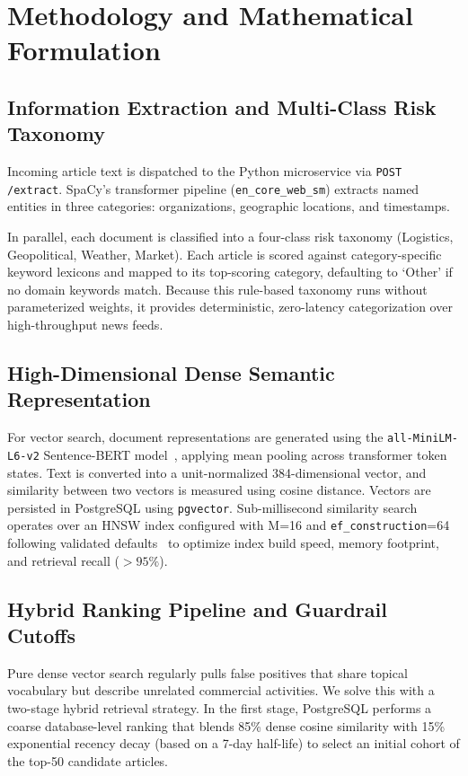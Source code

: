 \documentclass[conference]{IEEEtran}
\begin{document}
\section{Methodology and Mathematical Formulation}

\subsection{Information Extraction and Multi-Class Risk Taxonomy}
Incoming article text is dispatched to the Python microservice via \texttt{POST /extract}. SpaCy's transformer pipeline (\texttt{en\_core\_web\_sm}) extracts named entities in three categories: organizations, geographic locations, and timestamps.

In parallel, each document is classified into a four-class risk taxonomy (Logistics, Geopolitical, Weather, Market). Each article is scored against category-specific keyword lexicons and mapped to its top-scoring category, defaulting to `Other' if no domain keywords match. Because this rule-based taxonomy runs without parameterized weights, it provides deterministic, zero-latency categorization over high-throughput news feeds.

\subsection{High-Dimensional Dense Semantic Representation}
For vector search, document representations are generated using the \texttt{all-MiniLM-L6-v2} Sentence-BERT model~\cite{reimers2019sentence}, applying mean pooling across transformer token states. Text is converted into a unit-normalized 384-dimensional vector, and similarity between two vectors is measured using cosine distance. Vectors are persisted in PostgreSQL using \texttt{pgvector}. Sub-millisecond similarity search operates over an HNSW index configured with M=16 and \texttt{ef\_construction}=64 following validated defaults~\cite{malkov2020efficient} to optimize index build speed, memory footprint, and retrieval recall ($>95\%$).

\subsection{Hybrid Ranking Pipeline and Guardrail Cutoffs}
Pure dense vector search regularly pulls false positives that share topical vocabulary but describe unrelated commercial activities. We solve this with a two-stage hybrid retrieval strategy. In the first stage, PostgreSQL performs a coarse database-level ranking that blends 85\% dense cosine similarity with 15\% exponential recency decay (based on a 7-day half-life) to select an initial cohort of the top-50 candidate articles.
\end{document}
